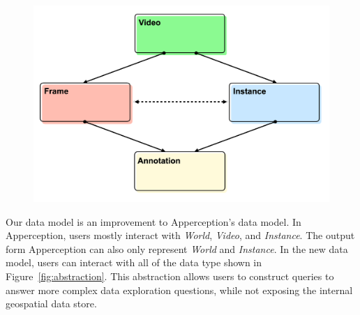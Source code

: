 \begin{figure}[ht]
    \centering
    \includegraphics[width=\columnwidth]{figures/data-hierarchy.png}
    \caption{\dataHierarchyCaption}
    \label{fig:hierarchy}
\end{figure}

Our data model is an improvement to Apperception's data model.
In Apperception, users mostly interact with \emph{World}, \emph{Video}, and \emph{Instance}.
The output form Apperception can also only represent \emph{World} and \emph{Instance}.
In the new data model, users can interact with all of the data type shown in Figure~\ref{fig:abstraction}.
This abstraction allows users to construct queries to answer more complex data exploration questions,
while not exposing the internal geospatial data store.
